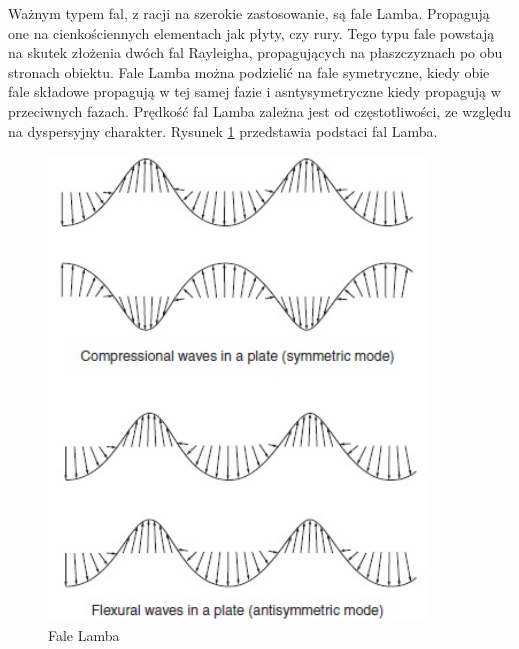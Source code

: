 Ważnym typem fal, z racji na szerokie zastosowanie, są fale Lamba. Propagują one na cienkościennych elementach jak płyty, czy rury. Tego typu fale powstają na skutek złożenia dwóch fal Rayleigha, propagujących na płaszczyznach po obu stronach obiektu. Fale Lamba można podzielić na fale symetryczne, kiedy obie fale składowe propagują w tej samej fazie i asntysymetryczne kiedy propagują w przeciwnych fazach. Prędkość fal Lamba zależna jest od częstotliwości, ze względu na dyspersyjny charakter. Rysunek \ref{fig:fala_lamba} przedstawia podstaci fal Lamba.

\begin{figure}[h]
\centering
\includegraphics[width=10cm]{Zdjecia/2/fala_lamba2}
\caption{Fale Lamba \cite{bartek_rose}}
\label{fig:fala_lamba}
\end{figure}






















